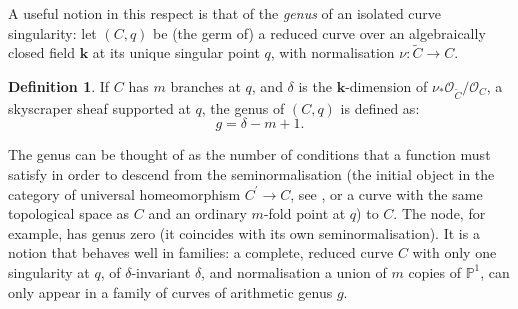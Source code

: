 \documentclass[11pt]{amsart}
\newcommand{\PP}{\mathbb P}
\renewcommand{\k}{\mathbf k}
\newcommand{\OO}{\mathcal O}
\renewcommand{\to}{\rightarrow}
\theoremstyle{plain}
\theoremstyle{definition}
\newtheorem{dfn}[thm]{Definition}
\begin{document}
A useful notion in this respect is that of the \emph{genus} of an isolated curve singularity: let $(C,q)$ be (the germ of) a reduced curve over an algebraically closed field $\k$ at its unique singular point $q$, with normalisation $\nu\colon\widetilde{C}\to C$.
\begin{dfn}\label{def:genus}\cite{SMY1}
If $C$ has $m$ branches at $q$, and $\delta$ is the $\k$-dimension of $\nu_*\OO_{\widetilde C}/\OO_C$, a skyscraper sheaf supported at $q$, the genus of $(C,q)$ is defined as:
\[g=\delta-m+1.\] 
\end{dfn}
The genus can be thought of as the number of conditions that a function must satisfy in order to descend from the seminormalisation (the initial object in the category of universal homeomorphism $C^\prime\to C$, see \cite[\href{https://stacks.math.columbia.edu/tag/0EUS}{Tag 0EUS}]{stacks-project}, or a curve with the same topological space as $C$ and an ordinary $m$-fold point at $q$) to $C$. The node, for example, has genus zero (it coincides with its own seminormalisation). It is a notion that behaves well in families: a complete, reduced curve $C$ with only one singularity at $q$, of $\delta$-invariant $\delta$, and normalisation a union of $m$ copies of $\PP^1$, can only appear in a family of curves of arithmetic genus $g$.
\end{document}
